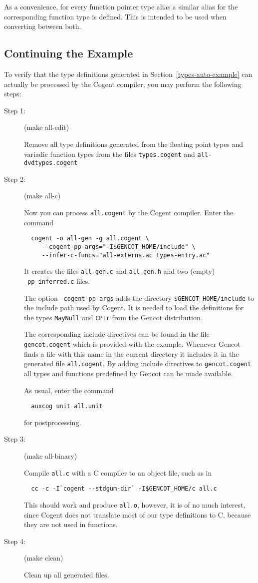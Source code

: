 \documentclass[a4paper]{report}
\newcommand{\code}[1]{\textnormal{\texttt{#1}}}
\begin{document}
As a convenience, for every function pointer type alias a similar alias for the corresponding function type is 
defined. This is intended to be used when converting between both.

\subsection{Continuing the Example}

To verify that the type definitions generated in Section~\ref{types-auto-example} can actually be processed by the 
Cogent compiler, you may perform the following steps:

\begin{description}
\item[Step 1:] (make all-edit)

Remove all type definitions generated from the floating point types and variadic function types 
from the files \code{types.cogent} and \code{all-dvdtypes.cogent}

\item[Step 2:] (make all-c)

Now you can process \code{all.cogent} by the Cogent compiler. Enter the command
\begin{verbatim}
  cogent -o all-gen -g all.cogent \
     --cogent-pp-args="-I$GENCOT_HOME/include" \
     --infer-c-funcs="all-externs.ac types-entry.ac"
\end{verbatim}
It creates the files \code{all-gen.c} and \code{all-gen.h} and two (empty) \code{\_pp\_inferred.c} files. 

The option \code{--cogent-pp-args} adds the directory \code{\$GENCOT\_HOME/include} to the include path
used by Cogent. It is needed to load the definitions for the types \code{MayNull} and \code{CPtr} from
the Gencot distribution. 

The corresponding include directives can be found in the file \code{gencot.cogent}
which is provided with the example. Whenever Gencot finds a file with this name in the current directory it 
includes it in the generated file \code{all.cogent}. By adding include directives to \code{gencot.cogent}
all types and functions predefined by Gencot can be made available.

As usual, enter the command
\begin{verbatim}
  auxcog unit all.unit
\end{verbatim}
for postprocessing.

\item[Step 3:] (make all-binary)

Compile \code{all.c} with a C compiler to an object file, such as in 
\begin{verbatim}
  cc -c -I`cogent --stdgum-dir` -I$GENCOT_HOME/c all.c
\end{verbatim}
This should work and produce \code{all.o}, however, it is of no much interest,
since Cogent does not translate most of our type definitions to C, because they are not used in functions.

\item[Step 4:] (make clean)

Clean up all generated files.
\end{description}
\end{document}
